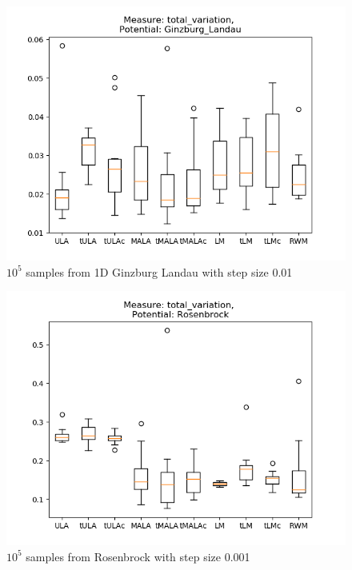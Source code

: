 \begin{figure}[ht!]
	\centering
		\includegraphics[height=0.43\textheight]{WriteUp/TV_ginzburg_step0pt01.png}
	\caption{$10^5$ samples from 1D Ginzburg Landau with step size 0.01}
	\label{fig:TVginz01}
\end{figure}

\begin{figure}[ht!]
	\centering
		\includegraphics[height=0.43\textheight]{WriteUp/TV_rosenbrock_step0pt001.png}
	\caption{$10^5$ samples from Rosenbrock with step size 0.001}
	\label{fig:TVrosen001}
\end{figure}

